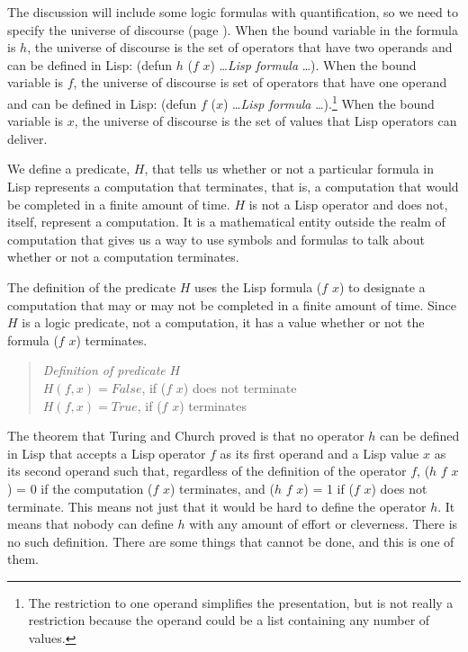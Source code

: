 The discussion will include some logic formulas with
quantification,
so we need to specify the universe of discourse
(page \pageref{def-universe-of-discourse}).
When the bound variable
in the formula is $h$, the universe of discourse
is the set of operators that have
two operands and can be defined in Lisp:
(defun $h$ ($f$ $x$) \dots \emph{Lisp formula} \dots ).
When the bound variable is $f$,
the universe of discourse is  set of operators
that have one operand and can be defined in Lisp:
(defun $f$ ($x$) \dots \emph{Lisp formula} \dots ).\footnote{The
restriction to one operand simplifies the presentation,
but is not really a restriction because the operand could
be a list containing any number of values.}
When the bound variable is $x$, the universe of discourse
is the set of values that Lisp operators can deliver.

We define a predicate, $H$, that tells us whether or not
a particular formula in Lisp represents a computation that terminates,
that is, a computation that would be completed in a finite amount of time.
$H$ is not a Lisp operator and does not, itself,
represent a computation. It is a mathematical entity
outside the realm of computation that gives us a way
to use symbols and formulas to talk about
whether or not a computation terminates.

The definition of the predicate $H$ uses the Lisp
formula ($f$ $x$) to designate a computation that may
or may not be completed in a finite amount of time.
Since $H$ is a logic predicate, not a computation,
it has a value whether or not the formula ($f$ $x$) terminates.
\begin{quote}
\label{def:predicate-H}
\emph{Definition of predicate} $H$\\
\hspace*{3mm}$H(f, x) = False$, if ($f$ $x$) does not terminate\\
\hspace*{3mm}$H(f, x) = True$, if ($f$ $x$) terminates
\end{quote}

The theorem that Turing and Church proved is that
no operator $h$ can be defined in Lisp
that accepts a Lisp operator $f$ as its
first operand and a Lisp value $x$ as its second operand
such that, regardless of the definition of the operator $f$,
($h$ $f$ $x$) = 0 if the computation ($f$ $x$) terminates, and
($h$ $f$ $x$) = 1 if ($f$ $x$) does not terminate.
This means not just that it would be hard to define the operator $h$.
It means that nobody can define $h$ with any amount of effort or cleverness.
There is no such definition.
There are some things that cannot be done, and this is one of them.

